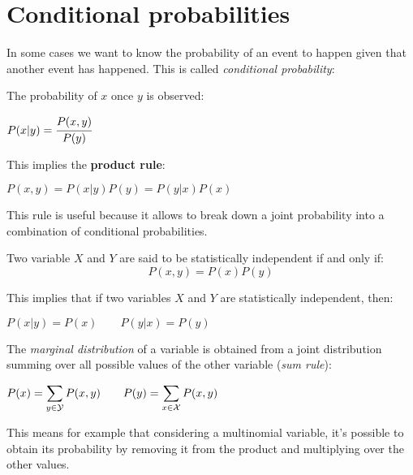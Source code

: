 \section{Conditional probabilities}
In some cases we want to know the probability of an event to happen given that another event has happened. This is called \textit{conditional probability}:
\begin{definition}
The probability of $x$ once $y$ is observed:
\begin{center}
	$\displaystyle P(x\vert y)=\cfrac{P(x,y)}{P(y)}$
\end{center}
\end{definition}
This implies the \textbf{product rule}:
\begin{definition}
\begin{center}
	$\displaystyle P(x,y)=P(x\vert y)P(y)=P(y\vert x)P(x)$
\end{center}
\label{def:ProductRule}
\end{definition}
This rule is useful because it allows to break down a joint probability into a combination of conditional probabilities.\newline 
\begin{definition}
	Two variable $X$ and $Y$ are said to be statistically independent if and only if:
\begin{equation}
	P(x,y)=P(x)P(y)
	\label{eq:Independence}
\end{equation}
\label{def:Independence}
\end{definition}
This implies that if two variables $X$ and $Y$ are statistically independent, then:
\begin{center}
	$\displaystyle P(x\vert y)=P(x)\qquad P(y\vert x)=P(y)$
\end{center}
\begin{definition}
The \textit{marginal distribution} of a variable is obtained from a joint distribution summing over all possible values of the other variable (\textit{sum rule}):
\begin{center}
	$\displaystyle P(x)=\displaystyle\sum_{y\in\mathcal{Y}}P(x,y)\qquad P(y)=\displaystyle\sum_{x\in\mathcal{X}}P(x,y)$
\end{center}
\label{def:LawTotalProbability}
\label{def:SumRule}
\end{definition}
This means for example that considering a multinomial variable, it's possible to obtain its probability by removing it from the product and multiplying over the other values.\newline
